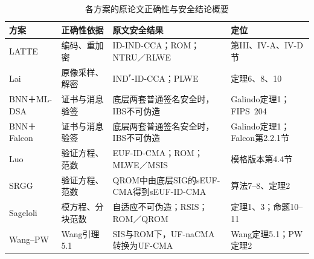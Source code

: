 \begin{table}[!htbp]
\centering\small
\caption{各方案的原论文正确性与安全结论概要}
\label{tab:paper-results-summary}
\begin{tabularx}{\textwidth}{@{}>{\raggedright\arraybackslash}p{}>{\raggedright\arraybackslash}p{}>{\raggedright\arraybackslash}p{}>{\raggedright\arraybackslash}X@{}}
\toprule
\rowcolor{black!8} 方案 & 正确性依据 & 原文安全结果 & 定位 \\
\midrule
LATTE & 编码、重加密 & ID-IND-CCA；ROM；NTRU／RLWE & 第III、IV-A、IV-D节\cite{zhao2024latte} \\
Lai & 原像采样、解密 & $\mathrm{IND}^{r}$-ID-CCA；PLWE & 定理6、8、10\cite{lai2015trapdoors} \\
BNN＋ML-DSA & 证书与消息验签 & 底层两套普通签名安全时，IBS不可伪造 & Galindo定理1；FIPS~204\cite{galindo2006ibs,nist2024fips204} \\
BNN＋Falcon & 证书与消息验签 & 底层两套普通签名安全时，IBS不可伪造 & Galindo定理1；Falcon第2.2.1节\cite{galindo2006ibs,falcon2020} \\
Luo & 验证方程、范数 & EUF-ID-CMA；ROM；MLWE／MSIS & 模格版本第4.4节\cite{luo2024ibs} \\
SRGG & 验证方程、范数 & QROM中由底层SIG的sEUF-CMA得到sEUF-ID-CMA & 算法7--8、定理2\cite{jia2025ibs} \\
Sageloli & 模方程、分块范数 & 自适应不可伪造；RSIS；ROM／QROM & 定理1、3；命题10--11\cite{sageloli2023ibs} \\
Wang--PW & Wang引理5.1 & SIS与ROM下，UF-naCMA转换为UF-CMA & Wang定理5.1；PW定理2\cite{wang2024ibme,pan2021ibs} \\
\bottomrule
\end{tabularx}
\end{table}
